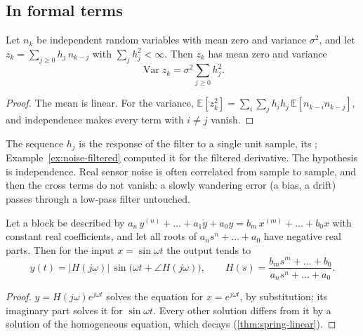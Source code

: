 \subsection{In formal terms}

\begin{theorem}
\label{thm:noise-variance}
Let $n_k$ be independent random variables with mean zero and variance $\sigma^2$, and let $z_k = \sum_{j \ge 0} h_j\,n_{k-j}$ with $\sum_j h_j^2 < \infty$. Then $z_k$ has mean zero and variance
\begin{equation*}
  \operatorname{Var} z_k = \sigma^2\sum_{j \ge 0} h_j^2 .
\end{equation*}
\end{theorem}
\begin{proof}
The mean is linear. For the variance, $\mathbb{E}[z_k^2] = \sum_i\sum_j h_ih_j\,\mathbb{E}[n_{k-i}n_{k-j}]$, and independence makes every term with $i \ne j$ vanish.
\end{proof}

The sequence $h_j$ is the response of the filter to a single unit sample, its ; Example~\ref{ex:noise-filtered} computed it for the filtered derivative. The hypothesis is independence. Real sensor noise is often correlated from sample to sample, and then the cross terms do not vanish: a slowly wandering error (a bias, a drift) passes through a low-pass filter untouched.

\begin{theorem}
\label{thm:noise-freq}
Let a block be described by $a_n\,y^{(n)} + \dots + a_1\dot y + a_0 y = b_m\,x^{(m)} + \dots + b_0 x$ with constant real coefficients, and let all roots of $a_ns^n + \dots + a_0$ have negative real parts. Then for the input $x = \sin\omega t$ the output tends to
\begin{equation*}
  y(t) = |H(j\omega)|\,\sin\big(\omega t + \angle H(j\omega)\big), \qquad H(s) = \frac{b_ms^m + \dots + b_0}{a_ns^n + \dots + a_0} .
\end{equation*}
\end{theorem}
\begin{proof}
$y = H(j\omega)e^{j\omega t}$ solves the equation for $x = e^{j\omega t}$, by substitution; its imaginary part solves it for $\sin\omega t$. Every other solution differs from it by a solution of the homogeneous equation, which decays (\cref{thm:spring-linear}).
\end{proof}

